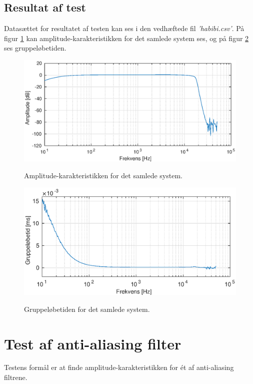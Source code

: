 \subsection{Resultat af test}
Datasættet for resultatet af testen kan ses i den vedhæftede fil \textit{'habibi.csv'}. På figur \ref{fig:tf_samletsystem} kan amplitude-karakteristikken for det samlede system ses, og på figur \ref{fig:tg_samletsystem} ses gruppeløbetiden. 
\begin{figure}[h]
	\caption{Amplitude-karakteristikken for det samlede system.}
	\includegraphics[width=1\linewidth]{./billeder/tf_samletsystem.eps}
	\label{fig:tf_samletsystem}
\end{figure}
\begin{figure}[h]
	\caption{Gruppeløbetiden for det samlede system.}
	\includegraphics[width=1\linewidth]{./billeder/tg_samletsystem.eps}
	\label{fig:tg_samletsystem}
\end{figure}

\section{Test af anti-aliasing filter}
Testens formål er at finde amplitude-karakteristikken for ét af anti-aliasing filtrene. 

